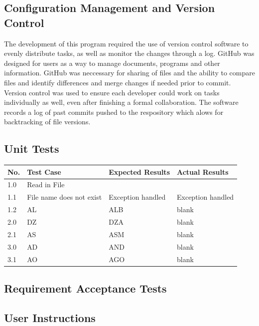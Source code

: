 \documentclass[12pt, a4]{report}
\begin{document}
	
	\pagebreak
	\subsection{Configuration Management and Version Control}
		\par 
		The development of this program required the use of version control software to evenly distribute tasks, as well as monitor the changes through a log. GitHub was designed for users as a way to manage documents, programs and other information. GitHub was neccessary for sharing of files and the ability to compare files and identify differences and merge changes if needed prior to commit. Version control was used to ensure each developer could work on tasks individually as well, even after finishing a formal collaboration. The software records a log of past commits pushed to the respository which alows for backtracking of file versions.
	
	\subsection{Unit Tests}


		\begin{tabular}{ |p{0.5cm}|p{5cm}|p{5cm}|p{5cm}| }
			\hline
			No. & Test Case & Expected Results & Actual Results \\
			\hline
			1.0 & Read in File & & \\
			1.1 & File name does not exist & Exception handled & Exception handled\\
			1.2 &AL & ALB & blank \\
			2.0    &DZ & DZA & blank \\
			2.1 & AS & ASM & blank\\
			3.0 & AD & AND   & blank \\
			3.1 & AO & AGO & blank\\
			\hline
		\end{tabular}
		
	\subsection{Requirement Acceptance Tests}

	\subsection{User Instructions}



	
\end{document}
